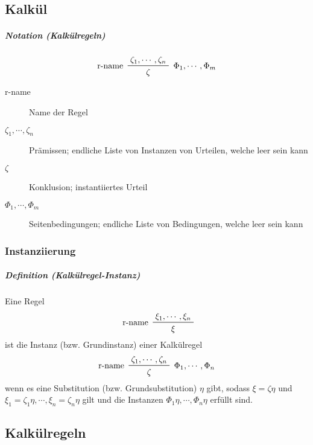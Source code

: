 \documentclass[a4paper, 11pt, accentcolor = tud3b]{tudreport}
\newcommand{\definition}[2]{\subparagraph{Definition (#1)} #2}
\newcommand{\notation}[2]{\subparagraph{Notation (#1)} #2}
\begin{document}
		    \subsection{Kalkül}
			    \notation{Kalkülregeln}{
			    	\begin{equation*}
				    	\prftree[l, r]
					    	{ $ \Phi _ 1, \cdots, \Phi _ m $ }
					    	{ r-name }
					    	{ \zeta _ 1, \cdots, \zeta _ n }
					    	{ \zeta }
			    	\end{equation*}
			    	
			    	\begin{description}
			    		\item[r-name] Name der Regel
			    		\item[$ \zeta _ 1, \cdots, \zeta _ n $] Prämissen; endliche Liste von Instanzen von Urteilen, welche leer sein kann
			    		\item[$ \zeta $] Konklusion; instantiiertes Urteil
			    		\item[$ \Phi _ 1, \cdots, \Phi _ m $] Seitenbedingungen; endliche Liste von Bedingungen, welche leer sein kann
			    	\end{description}
			    }
			    
			    \subsubsection{Instanziierung}
				    \definition{Kalkülregel-Instanz}{
					    Eine Regel
					    \begin{equation*}
						    \prftree[l]
							    { r-name }
							    { \xi _ 1, \cdots, \xi _ n }
							    { \xi }
					    \end{equation*}
					    ist die Instanz (bzw. Grundinstanz) einer Kalkülregel
					    \begin{equation*}
						    \prftree[l, r]
							    { $ \Phi _ 1, \cdots, \Phi _ n $ }
							    { r-name }
							    { \zeta _ 1, \cdots, \zeta _ n }
							    { \zeta }
					    \end{equation*}
					    wenn es eine Substitution (bzw. Grundsubstitution) $ \eta $ gibt, sodass $ \xi = \zeta\eta $ und $ \xi _ 1 = \zeta _ 1 \eta, \cdots, \xi _ n = \zeta _ n \eta $ gilt und die Instanzen $ \Phi _ 1 \eta, \cdots, \Phi _ n \eta $ erfüllt sind.
				    }
		    
		    \subsection{Kalkülregeln}
\end{document}
